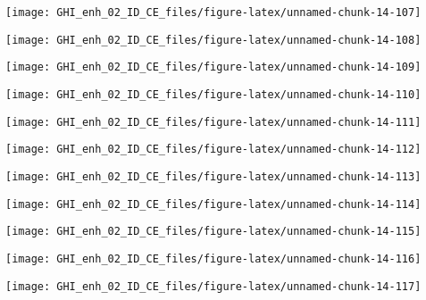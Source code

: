 \documentclass[
  10pt,
  a4paper,oneside]{article}
\begin{document}
\begin{center}\texttt{[image: GHI\_enh\_02\_ID\_CE\_files/figure-latex/unnamed-chunk-14-107]} \end{center}

\begin{center}\texttt{[image: GHI\_enh\_02\_ID\_CE\_files/figure-latex/unnamed-chunk-14-108]} \end{center}

\begin{center}\texttt{[image: GHI\_enh\_02\_ID\_CE\_files/figure-latex/unnamed-chunk-14-109]} \end{center}

\begin{center}\texttt{[image: GHI\_enh\_02\_ID\_CE\_files/figure-latex/unnamed-chunk-14-110]} \end{center}

\begin{center}\texttt{[image: GHI\_enh\_02\_ID\_CE\_files/figure-latex/unnamed-chunk-14-111]} \end{center}

\begin{center}\texttt{[image: GHI\_enh\_02\_ID\_CE\_files/figure-latex/unnamed-chunk-14-112]} \end{center}

\begin{center}\texttt{[image: GHI\_enh\_02\_ID\_CE\_files/figure-latex/unnamed-chunk-14-113]} \end{center}

\begin{center}\texttt{[image: GHI\_enh\_02\_ID\_CE\_files/figure-latex/unnamed-chunk-14-114]} \end{center}

\begin{center}\texttt{[image: GHI\_enh\_02\_ID\_CE\_files/figure-latex/unnamed-chunk-14-115]} \end{center}

\begin{center}\texttt{[image: GHI\_enh\_02\_ID\_CE\_files/figure-latex/unnamed-chunk-14-116]} \end{center}

\begin{center}\texttt{[image: GHI\_enh\_02\_ID\_CE\_files/figure-latex/unnamed-chunk-14-117]} \end{center}
\end{document}
